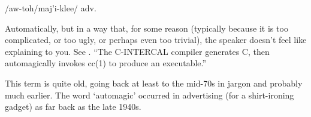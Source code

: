  /aw-toh/maj'i-klee/ adv.

Automatically, but in a way that, for some reason (typically because it is too
complicated, or too ugly, or perhaps even too trivial), the speaker doesn't
feel like explaining to you. See . ``The C-INTERCAL compiler
generates C, then automagically invokes cc(1) to produce an executable.''

This term is quite old, going back at least to the mid-70s in jargon and
probably much earlier. The word `automagic' occurred in advertising (for a
shirt-ironing gadget) as far back as the late 1940s.

